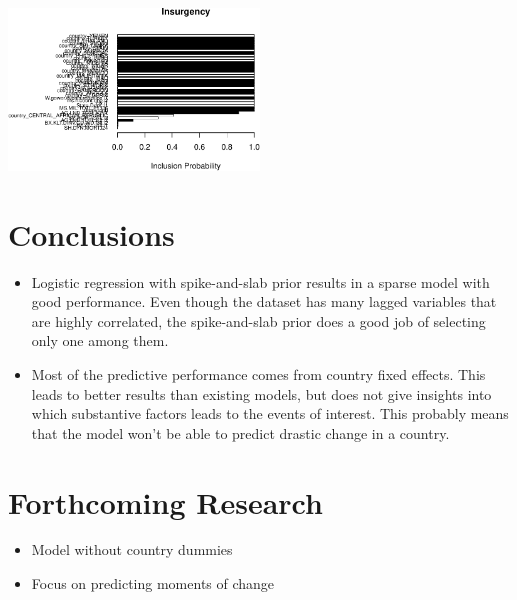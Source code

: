 \documentclass[a0,portrait]{a0poster}
\begin{document}
\begin{multicols}{2}
\begin{center}
\includegraphics[width=0.5\textwidth]{variable_selection}
\label{fig:variable_selection}
\end{center}




\color{SaddleBrown} %

\section*{Conclusions}

\begin{itemize}
\item Logistic regression with spike-and-slab prior results in a sparse model with good performance. Even though the dataset has many lagged variables that are highly correlated, the spike-and-slab prior does a good job of selecting only one among them.
\item Most of the predictive performance comes from country fixed effects. This leads to better results than existing models, but does not give insights into which substantive factors leads to the events of interest. This probably means that the model won't be able to predict drastic change in a country.
\end{itemize}

\color{DarkSlateGray} %


\section*{Forthcoming Research}

\begin{itemize}
\item Model without country dummies
\item Focus on predicting moments of change
\end{itemize}

\end{multicols}
\end{document}
